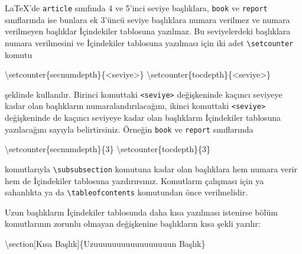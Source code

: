 \documentclass[
  10pt,
]{scrbook}
\newenvironment{Shaded}{\begin{snugshade}}{\end{snugshade}}
\newcommand{\DecValTok}[1]{\textcolor[rgb]{0.00,0.00,0.81}{#1}}
\newcommand{\NormalTok}[1]{#1}
\newcommand{\SpecialCharTok}[1]{\textcolor[rgb]{0.00,0.00,0.00}{#1}}
\begin{document}
LaTeX'de \texttt{article} sınıfında 4 ve 5'inci seviye başlıklara, \texttt{book} ve
\texttt{report} sınıflarında ise bunlara ek 3'üncü seviye başlıklara numara
verilmez ve numara verilmeyen başlıklar İçindekiler tablosuna yazılmaz.
Bu seviyelerdeki başlıklara numara verilmesini ve İçindekiler tablosuna
yazılması için iki adet \texttt{\textbackslash{}setcounter} komutu

\begin{Shaded}
\begin{Highlighting}[]
\NormalTok{\textbackslash{}setcounter\{secnumdepth\}\{}\SpecialCharTok{\textless{}}\NormalTok{seviye}\SpecialCharTok{\textgreater{}}\NormalTok{\}}
\NormalTok{\textbackslash{}setcounter\{tocdepth\}\{}\SpecialCharTok{\textless{}}\NormalTok{seviye}\SpecialCharTok{\textgreater{}}\NormalTok{\}}
\end{Highlighting}
\end{Shaded}

şeklinde kullanılır. Birinci komuttaki \texttt{\textless{}seviye\textgreater{}} değişkeninde kaçıncı
seviyeye kadar olan başlıkların numaralandırılacağını, ikinci komuttaki
\texttt{\textless{}seviye\textgreater{}} değişkeninde de kaçıncı seviyeye kadar olan başlıkların
İçindekiler tablosuna yazılacağını sayıyla belirtirsiniz. Örneğin \texttt{book}
ve \texttt{report} sınıflarında

\begin{Shaded}
\begin{Highlighting}[]
\NormalTok{\textbackslash{}setcounter\{secnumdepth\}\{}\DecValTok{3}\NormalTok{\}}
\NormalTok{\textbackslash{}setcounter\{tocdepth\}\{}\DecValTok{3}\NormalTok{\}}
\end{Highlighting}
\end{Shaded}

komutlarıyla \texttt{\textbackslash{}subsubsection} komutuna kadar olan başlıklara hem numara
verir hem de İçindekiler tablosuna yazdırırsınız. Komutların çalışması
için ya sahanlıkta ya da \texttt{\textbackslash{}tableofcontents} komutundan önce
verilmelidir.

Uzun başlıkların İçindekiler tablosunda daha kısa yazılması istenirse
bölüm komutlarının zorunlu olmayan değişkenine başlıkların kısa şekli
yazılır:

\begin{Shaded}
\begin{Highlighting}[]
\NormalTok{\textbackslash{}section[Kısa Başlık]\{Uzuuuuuuuuuuuuuuuuun Başlık\}}
\end{Highlighting}
\end{Shaded}
\end{document}
